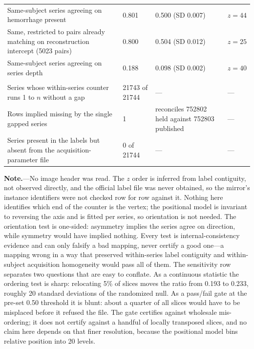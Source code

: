 \begin{table}[t]
\begin{tabular}{@{}p{} p{} p{} p{}@{}}
Same-subject series agreeing on hemorrhage present & 0.801 & 0.500 (SD 0.007) & $z=44$ \\
Same, restricted to pairs already matching on reconstruction intercept (\num{5023} pairs) & 0.800 & 0.504 (SD 0.012) & $z=25$ \\
Same-subject series agreeing on series depth & 0.188 & 0.098 (SD 0.002) & $z=40$ \\
\addlinespace[3pt]
\multicolumn{4}{@{}l}{\textbf{Structural reconciliation}}\\
\addlinespace[2pt]
Series whose within-series counter runs 1 to $n$ without a gap & \num{21743} of \num{21744} & --- & --- \\
Rows implied missing by the single gapped series & 1 & reconciles \num{752802} held against \num{752803} published & --- \\
Series present in the labels but absent from the acquisition-parameter file & 0 of \num{21744} & --- & --- \\
\bottomrule
\end{tabular}

\vspace{2pt}
\raggedright\scriptsize
\textbf{Note.}---No image header was read. The $z$ order is inferred from label
contiguity, not observed directly, and the official label file was never obtained,
so the mirror's instance identifiers were not checked row for row against it.
Nothing here identifies which end of the counter is the vertex; the positional
model is invariant to reversing the axis and is fitted per series, so orientation
is not needed. The orientation test is one-sided: asymmetry implies the series
agree on direction, while symmetry would have implied nothing. Every test is
internal-consistency evidence and can only falsify a bad mapping, never certify a
good one---a mapping wrong in a way that preserved within-series label contiguity
and within-subject acquisition homogeneity would pass all of them. The
sensitivity row separates two questions that are easy to conflate. As a
continuous statistic the ordering test is sharp: relocating 5\% of slices moves
the ratio from 0.193 to 0.233, roughly 20 standard deviations of the randomized
null. As a pass/fail gate at the pre-set 0.50 threshold it is blunt: about a
quarter of all slices would have to be misplaced before it refused the file. The
gate certifies against wholesale mis-ordering; it does not certify against a
handful of locally transposed slices, and no claim here depends on that finer
resolution, because the positional model bins relative position into 20 levels.
\end{table}
